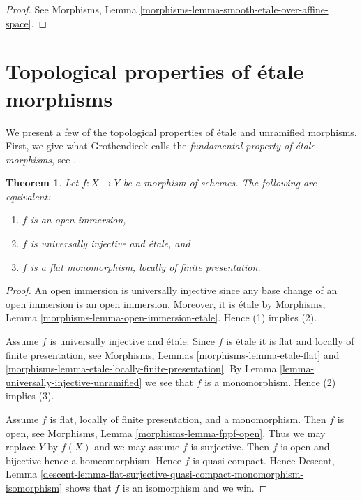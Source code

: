 \documentclass{stacks-project}
\theoremstyle{plain}
\newtheorem{theorem}[subsection]{Theorem}
\theoremstyle{definition}
\theoremstyle{remark}
\numberwithin{equation}{subsection}
\begin{document}
\begin{proof}
See
Morphisms, Lemma \ref{morphisms-lemma-smooth-etale-over-affine-space}.
\end{proof}




\section{Topological properties of \'etale morphisms}
\label{section-topological-etale}

\noindent
We present a few of the topological properties of \'etale and
unramified morphisms. First, we give what Grothendieck
calls the {\it fundamental property of \'etale morphisms}, see
\cite[Expos\'e I.5]{SGA1}.

\begin{theorem}
\label{theorem-etale-radicial-open}
Let $f : X \to Y$ be a morphism of schemes.
The following are equivalent:
\begin{enumerate}
\item $f$ is an open immersion,
\item $f$ is universally injective and \'etale, and
\item $f$ is a flat monomorphism, locally of finite presentation.
\end{enumerate}
\end{theorem}

\begin{proof}
An open immersion is universally injective
since any base change of an open immersion
is an open immersion. Moreover, it is \'etale by
Morphisms, Lemma \ref{morphisms-lemma-open-immersion-etale}.
Hence (1) implies (2).

\medskip\noindent
Assume $f$ is universally injective and \'etale.
Since $f$ is \'etale it is flat and locally of finite presentation, see
Morphisms, Lemmas \ref{morphisms-lemma-etale-flat} and
\ref{morphisms-lemma-etale-locally-finite-presentation}.
By
Lemma \ref{lemma-universally-injective-unramified}
we see that $f$ is a monomorphism. Hence (2) implies (3).

\medskip\noindent
Assume $f$ is flat, locally of finite presentation, and a monomorphism.
Then $f$ is open, see
Morphisms, Lemma \ref{morphisms-lemma-fppf-open}.
Thus we may replace $Y$ by $f(X)$ and we may assume $f$ is
surjective. Then $f$ is open and bijective hence a homeomorphism.
Hence $f$ is quasi-compact. Hence
Descent, Lemma
\ref{descent-lemma-flat-surjective-quasi-compact-monomorphism-isomorphism}
shows that $f$ is an isomorphism and we win.
\end{proof}
\end{document}
